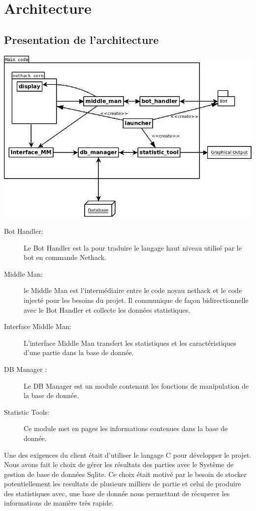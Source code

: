 \chapter{Architecture}

\section{Presentation de l'architecture}

\includegraphics[width=140mm]{Images/new_archi.jpeg}

\begin{description}
\item[Bot Handler: ] Le Bot Handler est la pour traduire le langage haut niveau utilisé par le bot en commande Nethack.
\item[Middle Man: ] le Middle Man est l'intermédiaire entre le code noyau nethack et le code injecté pour les besoins du projet. Il communique de façon bidirectionnelle avec le Bot Handler et collecte les données statistiques.
\item[Interface Middle Man: ] L'interface Middle Man transfert les statistiques et les caractéristiques d'une partie dans la base de donnée.
\item[DB Manager :] Le DB Manager est un module contenant les fonctions de manipulation de la base de donnée.
\item[Statistic Tools:] Ce module met en pages les informations contenues dans la base de donnée.  
\end{description}

Une des exigences du client était d'utiliser le langage C pour développer le projet. Nous avons fait le choix de gérer les résultats des parties avec le Système de gestion de base de données Sqlite. Ce choix était motivé par le besoin de stocker potentiellement les resultats de plusieurs milliers de partie et celui de produire des statistiques avec, une base de donnée nous permettant de récuperer les informations de manière très rapide.

